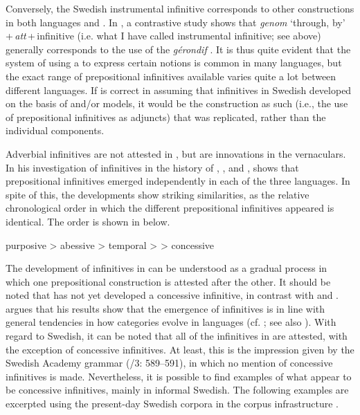 \documentclass[output=paper]{langscibook}
\begin{document}
Conversely, the Swedish instrumental infinitive corresponds to other constructions in both  languages and . In , a contrastive study shows that \textit{genom} ‘through, by’\,+\,\textit{att}\,+\,infinitive (i.e. what I have called instrumental infinitive; see  above) generally corresponds to the use of the \textit{gérondif} \citep[128]{Hellqvist2015}. It is thus quite evident that the system of using a  to express certain  notions is common in many languages, but the exact range of prepositional infinitives available varies quite a lot between different languages. If \citet{Holm1967} is correct in assuming that  infinitives in Swedish developed on the basis of  and/or  models, it would be the construction as such (i.e., the use of prepositional infinitives as  adjuncts) that was replicated, rather than the individual components. 



Adverbial infinitives are not attested in , but are innovations in the vernaculars. In his investigation of  infinitives in the history of , , and , \citet{Schulte2007Prepositional,Schulte2007What} shows that prepositional infinitives emerged independently in each of the three languages. In spite of this, the developments show striking similarities, as the relative chronological order in which the different prepositional infinitives appeared is identical. The order is shown in  below. 


\ea \label{ex:kalm:6}
purposive > abessive > temporal >  > concessive
\z

The development of  infinitives in  can be understood as a gradual process in which one prepositional construction is attested after the other. It should be noted that  has not yet developed a concessive infinitive, in contrast with  and . \citet{Schulte2007Prepositional} argues that his results show that the emergence of  infinitives is in line with general tendencies in how  categories evolve in languages (cf. \citealt{Cristofaro2005}; see also ). With regard to Swedish, it can be noted that all of the  infinitives in  are attested, with the exception of concessive infinitives. At least, this is the impression given by the Swedish Academy grammar (\citealt{TelemanEtAl1999}/3: 589–591), in which no mention of concessive infinitives is made. Nevertheless, it is possible to find examples of what appear to be concessive infinitives, mainly in informal Swedish. The following examples are excerpted using the present-day Swedish corpora in the corpus infrastructure  \citep{BorinEtAl2012}. 
\end{document}
